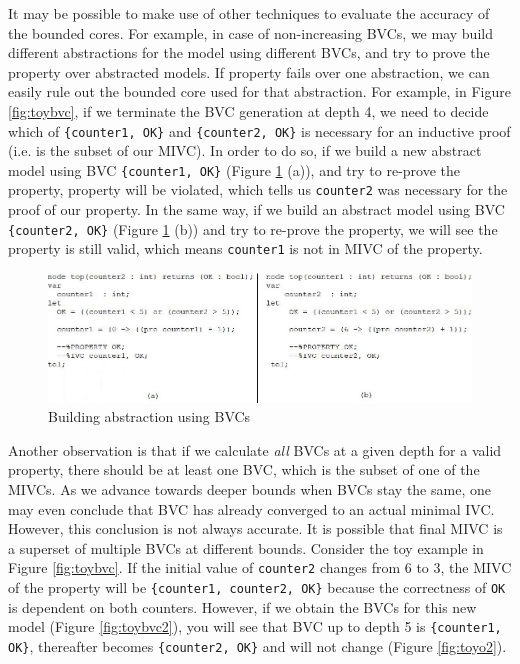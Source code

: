 It may be possible to make use of other techniques to evaluate the accuracy of the bounded cores. For example, in case of non-increasing BVCs, we may build different abstractions for the model using different BVCs, and try to prove the property over abstracted models. If property fails over one abstraction, we can easily rule out the bounded core used for that abstraction. For example, in Figure \ref{fig:toybvc}, if we terminate the BVC generation at depth 4, we need to decide which of {\small{\texttt{\{counter1, OK\}}}} and {\small{\texttt{\{counter2, OK\}}}} is necessary for an inductive proof (i.e. is the subset of our MIVC). In order to do so, if we build a new abstract model using BVC {\small{\texttt{\{counter1, OK\}}}} (Figure \ref{fig:absbvc} (a)), and try to re-prove the property, property will be violated, which tells us   {\small{\texttt{counter2}}} was necessary for the proof of our property. In the same way, if we build an abstract model using BVC  {\small{\texttt{\{counter2, OK\}}}} (Figure \ref{fig:absbvc} (b)) and try to re-prove the property, we will see the property is still valid, which means  {\small{\texttt{counter1}}} is not in MIVC of the property.

  \begin{figure}
 \centering
  \includegraphics[width=\textwidth]{figs/absbvc.jpg}
  \caption{Building abstraction using BVCs}
  \vspace{0.1in}
  \label{fig:absbvc}
\end{figure}


Another observation is that if we calculate \emph{all} BVCs at a given depth for a valid property, there should be at least one BVC, which is the subset of one of the MIVCs. As we advance towards deeper bounds when BVCs stay the same, one may even conclude that BVC has already converged to an actual minimal IVC. However, this conclusion is not always accurate. It is possible that final MIVC is a superset of multiple BVCs at different bounds. Consider the toy example in Figure \ref{fig:toybvc}. If the initial value of {\small{\texttt{counter2}}} changes from 6 to 3, the MIVC of the property will be {\small{\texttt{\{counter1, counter2, OK\}}}} because the correctness of {\small{\texttt{OK}}} is dependent on both counters. However, if we obtain the BVCs for this new model (Figure \ref{fig:toybvc2}), you will see that BVC up to depth 5 is  {\small{\texttt{\{counter1, OK\}}}}, thereafter becomes {\small{\texttt{\{counter2, OK\}}}} and will not change (Figure \ref{fig:toyo2}).

